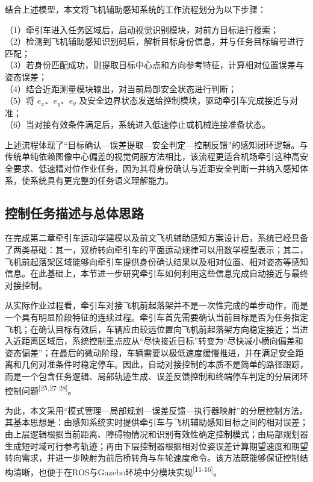 \documentclass[UTF8,a4paper,12pt]{ctexart}
\begin{document}
结合上述模型，本文将飞机辅助感知系统的工作流程划分为以下步骤：

（1）牵引车进入任务区域后，启动视觉识别模块，对前方目标进行搜索；\\
（2）检测到飞机辅助感知识别码后，解析目标身份信息，并与任务目标编号进行匹配；\\
（3）若身份匹配成功，则提取目标中心点和方向参考特征，计算相对位置误差与姿态误差；\\
（4）结合近距测量模块输出，对当前局部安全状态进行判断；\\
（5）将 \(e_{x}\)、\(e_{y}\)、\(e_{\theta}\) 及安全边界状态发送给控制模块，驱动牵引车完成接近与对准；\\
（6）当对接有效条件满足后，系统进入低速停止或机械连接准备状态。

上述流程体现了``目标确认---误差提取---安全判定---控制反馈''的感知闭环逻辑。与传统单纯依赖图像中心偏差的视觉伺服方法相比，该流程更适合机场牵引这种高安全要求、低速精对位作业任务，因为其将身份确认与近距安全判断一并纳入感知体系，使系统具有更完整的任务语义理解能力。

\subsection{控制任务描述与总体思路}\label{_Toc228997195}

在完成第二章牵引车运动学建模以及前文飞机辅助感知方案设计后，系统已经具备了两类基础：其一，双桥转向牵引车的平面运动规律可以用数学模型表示；其二，飞机前起落架区域能够向牵引车提供身份确认结果以及相对位置、相对姿态等感知信息。在此基础上，本节进一步研究牵引车如何利用这些信息完成自动接近与最终对接控制。

从实际作业过程看，牵引车对接飞机前起落架并不是一次性完成的单步动作，而是一个具有明显阶段特征的连续过程。牵引车首先需要确认当前目标是否为任务指定飞机；在确认目标有效后，车辆应由较远位置向飞机前起落架方向稳定接近；当进入近距离区域后，系统控制重点应从``尽快接近目标''转变为``尽快减小横向偏差和姿态偏差''；在最后的微动阶段，车辆需要以极低速度缓慢推进，并在满足安全距离和几何对准条件时稳定停车。因此，自动对接控制的本质不是简单的路径跟踪，而是一个包含任务逻辑、局部轨迹生成、误差反馈控制和终端停车判定的分层闭环控制问题\textsuperscript{[25,27-28]}。

为此，本文采用``模式管理---局部规划---误差反馈---执行器映射''的分层控制方法。其基本思想是：由感知系统实时提供牵引车与飞机辅助感知目标之间的相对误差；由上层逻辑根据当前距离、障碍物情况和识别有效性确定控制模式；由局部规划器生成短时域可行参考轨迹；再由下层控制器根据相对位姿误差计算期望速度和期望转向需求，并进一步映射为前后桥转角与车轮速度命令。该方法既能够保证控制结构清晰，也便于在ROS与Gazebo环境中分模块实现\textsuperscript{[11-16]}。
\end{document}

